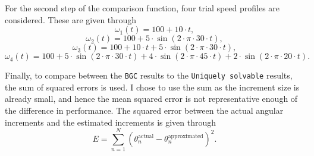 \documentclass{article}
\begin{document}
	For the second step of the comparison function, four trial speed profiles are considered. These are given through
	\begin{equation}
		\omega_1(t) = 100 + 10 \cdot t,
	\end{equation}
	\begin{equation}
		\omega_2(t) = 100 + 5 \cdot \sin \left(2\cdot \pi \cdot 30 \cdot t \right),
	\end{equation}
	\begin{equation}
		\omega_3(t) = 100 + 10 \cdot t + 5 \cdot \sin \left(2\cdot \pi \cdot 30 \cdot t \right),
	\end{equation}
	\begin{equation}
		\omega_4(t) = 100 + 5 \cdot \sin \left(2\cdot \pi \cdot 30 \cdot t \right) + 4 \cdot \sin \left(2\cdot \pi \cdot 45 \cdot t \right) + 2 \cdot \sin \left(2\cdot \pi \cdot 20 \cdot t \right).
	\end{equation}
	
	Finally, to compare between the \texttt{BGC} results to the \texttt{Uniquely solvable} results, the sum of squared errors is used. I chose to use the sum as the increment size is already small, and hence the mean squared error is not representative enough of the difference in performance. The squared error between the actual angular increments and the estimated increments is given through
	\begin{equation}
		E = \sum_{n=1}^{N} \left( \theta_{n}^{\text{actual}} - \theta_{n}^{\text{approximated}} \right)^2.
	\end{equation}
	
\end{document}
